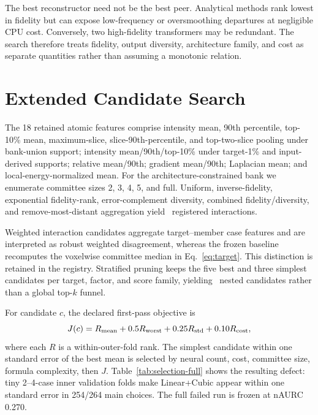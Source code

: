 \documentclass{article}
\begin{document}
The best reconstructor need not be the best peer. Analytical methods rank lowest in fidelity but can expose low-frequency or oversmoothing departures at negligible CPU cost. Conversely, two high-fidelity transformers may be redundant. The search therefore treats fidelity, output diversity, architecture family, and cost as separate quantities rather than assuming a monotonic relation.

\section{Extended Candidate Search}
The 18 retained atomic features comprise intensity mean, 90th percentile, top-10\% mean, maximum-slice, slice-90th-percentile, and top-two-slice pooling under bank-union support; intensity mean/90th/top-10\% under target-1\% and input-derived supports; relative mean/90th; gradient mean/90th; Laplacian mean; and local-energy-normalized mean. For the architecture-constrained bank we enumerate committee sizes 2, 3, 4, 5, and full. Uniform, inverse-fidelity, exponential fidelity-rank, error-complement diversity, combined fidelity/diversity, and remove-most-distant aggregation yield \NestedInteractionCount\ registered interactions.

Weighted interaction candidates aggregate target--member case features and are interpreted as robust weighted disagreement, whereas the frozen baseline recomputes the voxelwise committee median in Eq.~\eqref{eq:target}. This distinction is retained in the registry. Stratified pruning keeps the five best and three simplest candidates per target, factor, and score family, yielding \NestedRetainedCount\ nested candidates rather than a global top-$k$ funnel.

\begin{table}[!t]
 \centering
 \caption{Unconstrained first-pass nested choices. Neural is the mean number of neural peers selected across outer folds and all audited targets.}
 \resizebox{\columnwidth}{!}{}
 \label{tab:selection-full}
\end{table}

For candidate $c$, the declared first-pass objective is
\begin{equation}
 J(c)=R_{\rm mean}+0.5R_{\rm worst}+0.25R_{\rm std}+0.10R_{\rm cost},
\end{equation}
where each $R$ is a within-outer-fold rank. The simplest candidate within one standard error of the best mean is selected by neural count, cost, committee size, formula complexity, then $J$. Table~\ref{tab:selection-full} shows the resulting defect: tiny 2--4-case inner validation folds make Linear+Cubic appear within one standard error in 254/264 main choices. The full failed run is frozen at nAURC 0.270.
\end{document}
